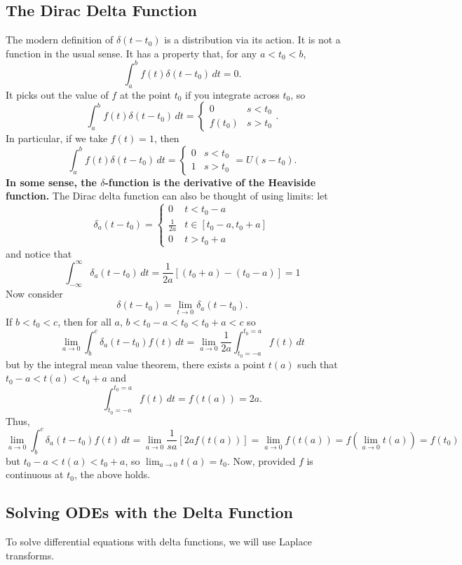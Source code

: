 \documentclass[11pt]{article}
\begin{document}
\subsection{The Dirac Delta Function}
	The modern definition of $\delta (t - t_0)$ is a distribution via its action. It is not a function in the usual sense. It has a property that, for any $a < t_0 < b$,
		$$ \int_a^b f(t) \delta (t - t_0) \,dt = 0. $$
	It picks out the value of $f$ at the point $t_0$ if you integrate across $t_0$, so
		$$ \int_a^b f(t) \delta (t - t_0) \, dt = \left\{
			\begin{array}{cc}
				0 & s < t_0 \\
				f(t_0) & s > t_0
			\end{array}
			\right. .
		$$
	In particular, if we take $f(t) = 1$, then
		$$ \int_a^b f(t) \delta (t - t_0) \, dt = \left\{
			\begin{array}{cc}
				0 & s < t_0 \\
				1 & s > t_0
			\end{array}
			\right. = U(s - t_0).
		$$
	\textbf{In some sense, the $\delta$-function is the derivative of the Heaviside function.} The Dirac delta function can also be thought of using limits: let
		$$ \delta_a (t-t_0) = \left\{
			\begin{array}{cc}
				0 & t < t_0 - a \\
				\frac{1}{2a} & t \in [t_0 - a, t_0 + a] \\
				0 & t > t_0 + a
			\end{array}
			\right.
		$$
	and notice that
		$$ \int_{-\infty}^{\infty} \delta_a (t-t_0) \,dt = \frac{1}{2a} [(t_0 + a) - (t_0 - a)] = 1 $$
	Now consider
		$$ \delta (t - t_0) = \lim_{t \to 0} \delta_a (t-t_0). $$
	If $b < t_0 < c$, then for all $a$, $b < t_0 - a < t_0 < t_0 + a < c$ so
		$$ \lim_{a \to 0} \int_b^c \delta_a (t-t_0) f(t) \,dt = \lim_{a \to 0} \frac{1}{2a} \int_{t_0 = -a}^{t_0 = a} f(t) \,dt $$
	but by the integral mean value theorem, there exists a point $t(a)$ such that $t_0 - a < t(a) < t_0 + a$ and
		$$ \int_{t_0 = -a}^{t_0 = a} f(t) \,dt = f(t(a)) = 2a .$$
	Thus,
		$$ \lim_{a \to 0} \int_b^c \delta_a (t-t_0) f(t) \,dt = \lim_{a \to 0} \frac{1}{sa} [2 a f(t(a))] = \lim_{a \to 0} f(t(a)) = f (\lim_{a \to 0} t(a)) = f(t_0) $$
	but $t _0 - a < t(a) < t_0 + a$, so $\lim_{a \to 0} t(a) = t_0$. Now, provided $f$ is continuous at $t_0$, the above holds.

\subsection{Solving ODEs with the Delta Function}
	To solve differential equations with delta functions, we will use Laplace transforms.
\end{document}
